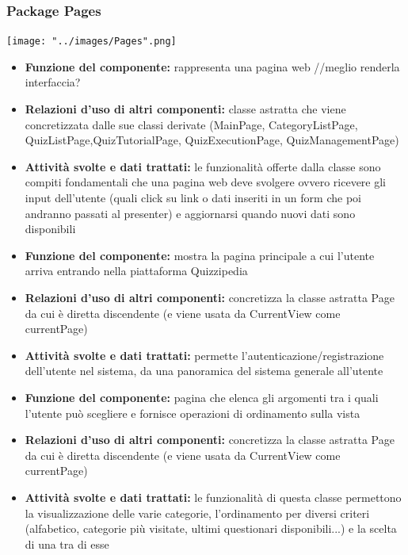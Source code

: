 \documentclass[a4paper,11pt]{article}
\begin{document}
			\subsubsection{Package Pages}
			\begin{center}
				\centerline{\texttt{[image: "../images/Pages".png]}}
			\end{center}
			\begin{itemize}
		    \item\textbf{Funzione del componente:} rappresenta una pagina web //meglio renderla interfaccia?
			\item\textbf{Relazioni d'uso di altri componenti:} classe astratta che viene concretizzata dalle sue classi derivate (MainPage, CategoryListPage, QuizListPage,QuizTutorialPage, QuizExecutionPage, QuizManagementPage)
			\item\textbf{Attività svolte e dati trattati:} le funzionalità offerte dalla classe sono compiti fondamentali che una pagina web deve svolgere ovvero ricevere gli input dell'utente (quali click su link o dati inseriti in un form che poi andranno passati al presenter) e aggiornarsi quando nuovi dati sono disponibili
			\end{itemize}
			\begin{itemize}
		    \item\textbf{Funzione del componente:} mostra la pagina principale a cui l'utente arriva entrando nella piattaforma Quizzipedia 
			\item\textbf{Relazioni d'uso di altri componenti:} concretizza la classe astratta Page da cui è diretta discendente (e viene usata da CurrentView come currentPage)
			\item\textbf{Attività svolte e dati trattati:} permette l'autenticazione/registrazione dell'utente nel sistema, da una panoramica del sistema generale all'utente
			\end{itemize}
			\begin{itemize}
		    \item\textbf{Funzione del componente:} pagina che elenca gli argomenti tra i quali l'utente può scegliere e fornisce operazioni di ordinamento sulla vista 
			\item\textbf{Relazioni d'uso di altri componenti:} concretizza la classe astratta Page da cui è diretta discendente (e viene usata da CurrentView come currentPage)
			\item\textbf{Attività svolte e dati trattati:} le funzionalità di questa classe permettono la visualizzazione delle varie categorie, l'ordinamento per diversi criteri (alfabetico, categorie più visitate, ultimi questionari disponibili...) e la scelta di una tra di esse
			\end{itemize}
\end{document}
